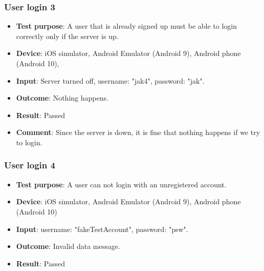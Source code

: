 \documentclass[../ATD.tex]{subfiles}
\begin{document}
    \subsubsection{User login 3}\label{subsubsec:user-login-3}
    \begin{itemize}
        \item \textbf{Test purpose}: A user that is already signed up must be able to login correctly only if the server is up.
        \item \textbf{Device}: iOS simulator, Android Emulator (Android 9), Android phone (Android 10),
        \item \textbf{Input}: Server turned off, username: "jak4", password: "jak".
        \item \textbf{Outcome}: Nothing happens.
        \item \textbf{Result}: Passed
        \item \textbf{Comment}: Since the server is down, it is fine that nothing happens if we try to login.
    \end{itemize}

    \subsubsection{User login 4}\label{subsubsec:user-login-4}
    \begin{itemize}
        \item \textbf{Test purpose}: A user can not login with an unregistered account.
        \item \textbf{Device}: iOS simulator, Android Emulator (Android 9), Android phone (Android 10)
        \item \textbf{Input}: username: "fakeTestAccount", password: "psw".
        \item \textbf{Outcome}: Invalid data message.
        \item \textbf{Result}: Passed
    \end{itemize}
\end{document}
